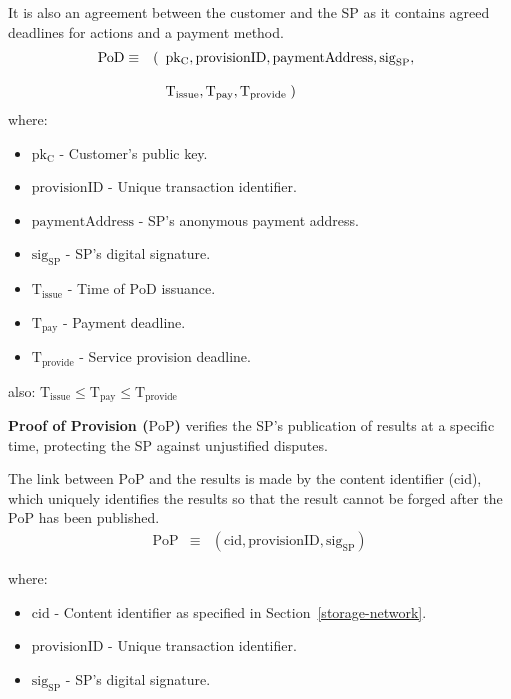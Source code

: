 \documentclass[pdftex,twocolumn,epjc3]{svjour3}
\begin{document}
It is also an agreement between the customer and the SP as it contains agreed deadlines for actions and a payment method.
\begin{eqnarray*}
\mathrm{PoD} & \equiv & (\begin{array}[t]{l}\mathrm{pk_C}, \mathrm{provisionID},   \mathrm{paymentAddress},
\mathrm{sig}_\mathrm{SP}, \\\\ 
\mathrm{T}_\mathrm{issue}, \mathrm{T}_\mathrm{pay}, \mathrm{T}_\mathrm{provide}\; )\end{array}
\end{eqnarray*}
where:
\begin{itemize}
\item $\mathrm{pk_C}$ - Customer's public key.
\item $\mathrm{provisionID}$ - Unique transaction identifier.
\item $\mathrm{paymentAddress}$ - SP's anonymous payment address.
\item $\mathrm{sig}_\mathrm{SP}$ - SP's digital signature.
\item $\mathrm{T}_\mathrm{issue}$ - Time of $\mathrm{PoD}$ issuance.
\item $\mathrm{T}_\mathrm{pay}$ - Payment deadline.
\item $\mathrm{T}_\mathrm{provide}$ - Service provision deadline.
\end{itemize}

also:
\(\mathrm{T}_\mathrm{issue} \leq \mathrm{T}_\mathrm{pay} \leq \mathrm{T}_\mathrm{provide}\)

\noindent \textbf{Proof of Provision ($\mathrm{PoP}$)}\label{proof-of-provision} verifies the SP's publication of results at a specific time, protecting the SP against unjustified disputes.

The link between $\mathrm{PoP}$ and the results is made by the content identifier ($\mathrm{cid}$), which uniquely identifies the results so that the result cannot be forged after the $\mathrm{PoP}$ has been published.
\begin{eqnarray*}
\mathrm{PoP} & \equiv & (\mathrm{cid}, \mathrm{provisionID}, \mathrm{sig}_\mathrm{SP})
\end{eqnarray*}

where:
\begin{itemize}
\item $\mathrm{cid}$ - Content identifier as specified in Section~\ref{storage-network}.
\item $\mathrm{provisionID}$ - Unique transaction identifier.
\item $\mathrm{sig}_\mathrm{SP}$ - SP's digital signature.
\end{itemize}
\end{document}
